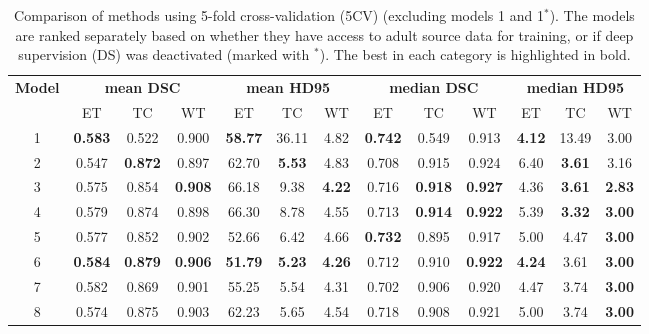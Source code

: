 \documentclass[runningheads]{llncs}
\begin{document}
\begin{table}[t]
\caption{Comparison of methods using 5-fold cross-validation (5CV) (excluding models 1 and 1$^*$).
The models are ranked separately based on whether they have access to adult source data for training, or if deep supervision (DS) was deactivated (marked with $^*$). The best in each category is highlighted in bold.}\label{tab:SDA}
\centering
\begin{tabular}{cccc|ccc|ccc|ccc}
\hline
\multirow{2}{*}{\textbf{Model}} & \multicolumn{3}{c|}{\textbf{mean DSC}}           & \multicolumn{3}{c|}{\textbf{mean HD95}}         & \multicolumn{3}{c|}{\textbf{median DSC}}         & \multicolumn{3}{c}{\textbf{median HD95}}        \\ \cline{2-13} 
                                & ET             & TC             & WT             & ET              & TC            & WT            & ET             & TC             & WT             & ET             & TC            & WT            \\ \hline
1                               &  \textbf{0.583}& 0.522& 0.900&  \textbf{58.77}& 36.11& 4.82&  \textbf{0.742}& 0.549& 0.913&  \textbf{4.12}& 13.49& 3.00\\
2                               & 0.547&  \textbf{0.872}& 0.897& 62.70&  \textbf{5.53}& 4.83& 0.708& 0.915& 0.924& 6.40&  \textbf{3.61}& 3.16\\
3                               & 0.575& 0.854&  \textbf{0.908}& 66.18& 9.38&  \textbf{4.22}& 0.716&  \textbf{0.918}&  \textbf{0.927}& 4.36&  \textbf{3.61}&  \textbf{2.83}\\ \hline
4                               & 0.579& 0.874& 0.898& 66.30& 8.78& 4.55& 0.713&  \textbf{0.914}&  \textbf{0.922}& 5.39&  \textbf{3.32}&  \textbf{3.00}\\
5                               & 0.577& 0.852& 0.902& 52.66& 6.42& 4.66&  \textbf{0.732}& 0.895& 0.917& 5.00& 4.47&  \textbf{3.00}\\
6                               &  \textbf{0.584}&  \textbf{0.879}&  \textbf{0.906}&  \textbf{51.79}&  \textbf{5.23}&  \textbf{4.26}& 0.712& 0.910&  \textbf{0.922}&  \textbf{4.24}& 3.61&  \textbf{3.00}\\
7                               & 0.582& 0.869& 0.901& 55.25& 5.54& 4.31& 0.702& 0.906& 0.920& 4.47& 3.74&  \textbf{3.00}\\
8                               & 0.574& 0.875& 0.903& 62.23& 5.65& 4.54& 0.718& 0.908& 0.921& 5.00& 3.74&  \textbf{3.00}\\ \hline

\end{tabular}
\end{table}
\end{document}
